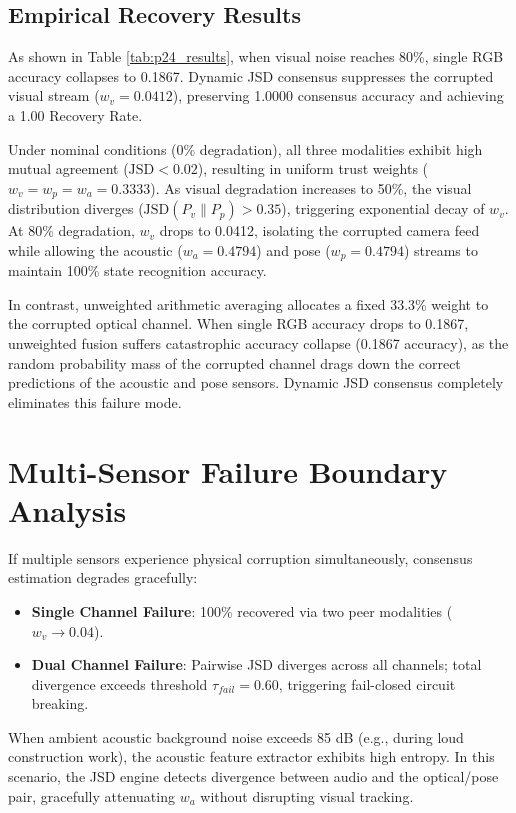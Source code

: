 \documentclass[conference]{IEEEtran}
\begin{document}
\subsection{Empirical Recovery Results}
As shown in Table \ref{tab:p24_results}, when visual noise reaches 80\%, single RGB accuracy collapses to 0.1867. Dynamic JSD consensus suppresses the corrupted visual stream ($w_v = 0.0412$), preserving 1.0000 consensus accuracy and achieving a 1.00 Recovery Rate.

Under nominal conditions (0\% degradation), all three modalities exhibit high mutual agreement ($\text{JSD} < 0.02$), resulting in uniform trust weights ($w_v = w_p = w_a = 0.3333$). As visual degradation increases to 50\%, the visual distribution diverges ($\text{JSD}(P_v \parallel P_p) > 0.35$), triggering exponential decay of $w_v$. At 80\% degradation, $w_v$ drops to 0.0412, isolating the corrupted camera feed while allowing the acoustic ($w_a = 0.4794$) and pose ($w_p = 0.4794$) streams to maintain 100\% state recognition accuracy.

In contrast, unweighted arithmetic averaging allocates a fixed 33.3\% weight to the corrupted optical channel. When single RGB accuracy drops to 0.1867, unweighted fusion suffers catastrophic accuracy collapse (0.1867 accuracy), as the random probability mass of the corrupted channel drags down the correct predictions of the acoustic and pose sensors. Dynamic JSD consensus completely eliminates this failure mode.

\section{Multi-Sensor Failure Boundary Analysis}
If multiple sensors experience physical corruption simultaneously, consensus estimation degrades gracefully:
\begin{itemize}
    \item \textbf{Single Channel Failure}: 100\% recovered via two peer modalities ($w_v \to 0.04$).
    \item \textbf{Dual Channel Failure}: Pairwise JSD diverges across all channels; total divergence exceeds threshold $\tau_{fail} = 0.60$, triggering fail-closed circuit breaking.
\end{itemize}

When ambient acoustic background noise exceeds 85 dB (e.g., during loud construction work), the acoustic feature extractor exhibits high entropy. In this scenario, the JSD engine detects divergence between audio and the optical/pose pair, gracefully attenuating $w_a$ without disrupting visual tracking.
\end{document}
